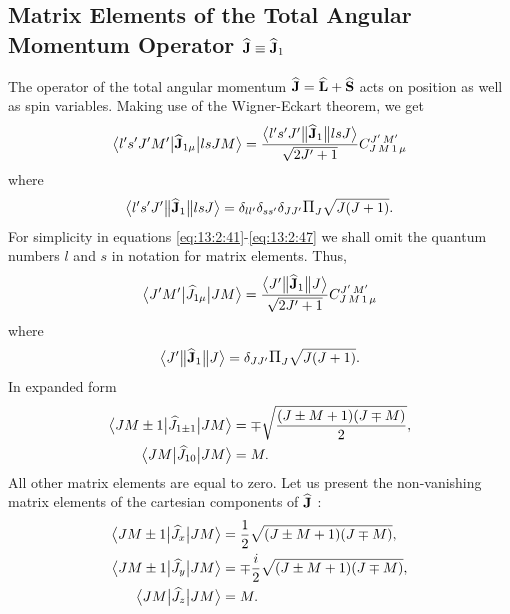 \subsection{Matrix Elements of the Total Angular Momentum Operator \(\widehat{\mathbf{J}} \equiv \widehat{\mathbf{J}}_{1}\)}\label{sec:13.2.5}
The operator of the total angular momentum \(\widehat{\mathbf{J}}=\widehat{\mathbf{L}}+\widehat{\mathbf{S}}\) acts on position as well as spin variables. Making use of the Wigner-Eckart theorem, we get
\begin{equation}
\bigl\langle  l^{\prime} s^{\prime} J^{\prime} M^{\prime} \big|  \widehat{\mathbf{J}}_{1 \mu} \big| l s J M \bigr\rangle=\frac{
\bigl\langle  l^{\prime} s^{\prime} J^{\prime} \big\Vert \widehat{\mathbf{J}}_{1} \big\Vert  l s J \bigr\rangle}{\sqrt{2 J^{\prime}+1}} 
C_{J\,M\,1\,\mu}^{J^{\prime}\,M^{\prime}} \label{eq:13:2:37}
\end{equation}
where
\begin{equation}
\braOketred{ l^{\prime} s^{\prime} J^{\prime}}{\widehat{\vect{J}}_{1}}{ l s J}=\delta_{l l^{\prime}} \delta_{s s^{\prime}} \delta_{J J^{\prime}} \Fact{J}\sqrt{J(J+1)}. \label{eq:13:2:38}
\end{equation}
For simplicity in equations \eqref{eq:13:2:41}-\eqref{eq:13:2:47} we shall omit the quantum numbers \(l\) and \(s\) in notation for matrix elements. Thus,
\begin{equation}
\bigl\langle  J^{\prime} M^{\prime} \big|  \widehat{J}_{1 \mu} \big| J M \bigr\rangle=\frac{
\bigl\langle  J^{\prime} \big\Vert \widehat{\mathbf{J}}_{1} \big\Vert  J \bigr\rangle}{\sqrt{2 J^{\prime}+1}} 
C_{J\,M\,1\,\mu}^{J^{\prime}\,M^{\prime}} \label{eq:13:2:39}
\end{equation}
where
\begin{equation}
\braOketred{ J^{\prime}}{\widehat{\vect{J}}_{1}}{ J}=\delta_{J J^{\prime}}\Fact{J} \sqrt{J(J+1)}. \label{eq:13:2:40}
\end{equation}
In expanded form
\begin{align}
\bigl\langle  J M \pm 1 \big|  \widehat{J}_{1 \pm 1} \big| J M \bigr\rangle & =\mp \sqrt{\frac{(J \pm M+1)(J \mp M)}{2}} , \label{eq:13:2:41}\\
\bigl\langle  J M \big|  \widehat{J}_{10} \big| J M \bigr\rangle & =M. \notag
\end{align}
All other matrix elements are equal to zero. Let us present the non-vanishing matrix elements of the cartesian components of \(\widehat{\mathbf{J}}\) :
\begin{align}
\bigl\langle  J M \pm 1 \big|  \widehat{J}_{x} \big| J M \bigr\rangle & =\frac{1}{2} \sqrt{(J \pm M+1)(J \mp M)}, \notag \\
\bigl\langle  J M \pm 1 \big|  \widehat{J}_{y} \big| J M \bigr\rangle & =\mp \frac{i}{2} \sqrt{(J \pm M+1)(J \mp M)},  \label{eq:13:2:42}\\
\bigl\langle  J M \big|  \widehat{J}_{z} \big| J M \bigr\rangle & =M. \notag
\end{align}
